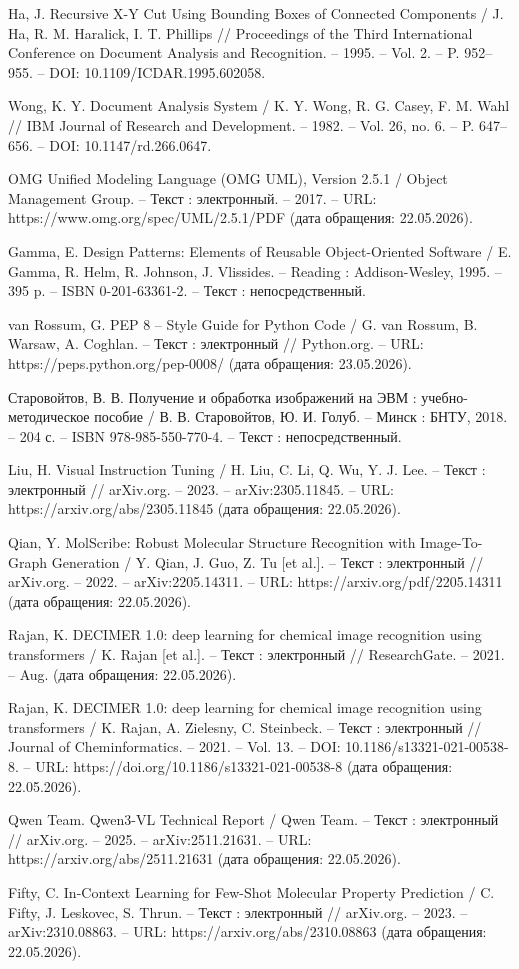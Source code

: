 Ha, J. Recursive X-Y Cut Using Bounding Boxes of Connected Components / J. Ha, R. M. Haralick, I. T. Phillips // Proceedings of the Third International Conference on Document Analysis and Recognition. – 1995. – Vol. 2. – P. 952–955. – DOI: 10.1109/ICDAR.1995.602058.

Wong, K. Y. Document Analysis System / K. Y. Wong, R. G. Casey, F. M. Wahl // IBM Journal of Research and Development. – 1982. – Vol. 26, no. 6. – P. 647–656. – DOI: 10.1147/rd.266.0647.

OMG Unified Modeling Language (OMG UML), Version 2.5.1 / Object Management Group. – Текст : электронный. – 2017. – URL: https://www.omg.org/spec/UML/2.5.1/PDF (дата обращения: 22.05.2026).

Gamma, E. Design Patterns: Elements of Reusable Object-Oriented Software / E. Gamma, R. Helm, R. Johnson, J. Vlissides. – Reading : Addison-Wesley, 1995. – 395 p. – ISBN 0-201-63361-2. – Текст : непосредственный.

van Rossum, G. PEP 8 -- Style Guide for Python Code / G. van Rossum, B. Warsaw, A. Coghlan. – Текст : электронный // Python.org. – URL: https://peps.python.org/pep-0008/ (дата обращения: 23.05.2026).

Старовойтов, В. В. Получение и обработка изображений на ЭВМ : учебно-методическое пособие / В. В. Старовойтов, Ю. И. Голуб. – Минск : БНТУ, 2018. – 204 с. – ISBN 978-985-550-770-4. – Текст : непосредственный.

Liu, H. Visual Instruction Tuning / H. Liu, C. Li, Q. Wu, Y. J. Lee. – Текст : электронный // arXiv.org. – 2023. – arXiv:2305.11845. – URL: https://arxiv.org/abs/2305.11845 (дата обращения: 22.05.2026).

Qian, Y. MolScribe: Robust Molecular Structure Recognition with Image-To-Graph Generation / Y. Qian, J. Guo, Z. Tu [et al.]. – Текст : электронный // arXiv.org. – 2022. – arXiv:2205.14311. – URL: https://arxiv.org/pdf/2205.14311 (дата обращения: 22.05.2026).

Rajan, K. DECIMER 1.0: deep learning for chemical image recognition using transformers / K. Rajan [et al.]. – Текст : электронный // ResearchGate. – 2021. – Aug. (дата обращения: 22.05.2026).

Rajan, K. DECIMER 1.0: deep learning for chemical image recognition using transformers / K. Rajan, A. Zielesny, C. Steinbeck. – Текст : электронный // Journal of Cheminformatics. – 2021. – Vol. 13. – DOI: 10.1186/s13321-021-00538-8. – URL: https://doi.org/10.1186/s13321-021-00538-8 (дата обращения: 22.05.2026).

Qwen Team. Qwen3-VL Technical Report / Qwen Team. – Текст : электронный // arXiv.org. – 2025. – arXiv:2511.21631. – URL: https://arxiv.org/abs/2511.21631 (дата обращения: 22.05.2026).

Fifty, C. In-Context Learning for Few-Shot Molecular Property Prediction / C. Fifty, J. Leskovec, S. Thrun. – Текст : электронный // arXiv.org. – 2023. – arXiv:2310.08863. – URL: https://arxiv.org/abs/2310.08863 (дата обращения: 22.05.2026).
